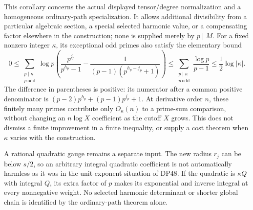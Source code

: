 This corollary concerns the actual displayed tensor/degree normalization and a homogeneous ordinary-path specialization. It allows additional divisibility from a particular algebraic section, a special selected harmonic value, or a compensating factor elsewhere in the construction; none is supplied merely by $p\mid M$.
For a fixed nonzero integer $\kappa$, its exceptional odd primes also satisfy the elementary bound
\[
 0\le\sum_{\substack{p\mid\kappa\\p\ \mathrm{odd}}}\log p
 \left(\frac{p^{j_p}}{p^{h_p}-1}
       -\frac1{(p-1)(p^{h_p-j_p}+1)}\right)
 \le\sum_{\substack{p\mid\kappa\\p\ \mathrm{odd}}}\frac{\log p}{p-1}
 \le\frac12\log|\kappa|.
\]
The difference in parentheses is positive: its numerator after a common positive denominator is
$(p-2)p^{h_p}+(p-1)p^{j_p}+1$.
At derivative order $n$, these finitely many primes contribute only $O_\kappa(n)$ to a prime-sum comparison, without changing an $n\log X$ coefficient as the cutoff $X$ grows. This does not dismiss a finite improvement in a finite inequality, or supply a cost theorem when $\kappa$ varies with the construction.

A rational quadratic gauge remains a separate input. The new radius $r_j$ can be below $s/2$, so an arbitrary integral quadratic coefficient is not automatically harmless as it was in the unit-exponent situation of DP48. If the quadratic is $\kappa Q$ with integral $Q$, its extra factor of $p$ makes its exponential and inverse integral at every nonnegative weight. No selected harmonic determinant or shorter global chain is identified by the ordinary-path theorem alone.

